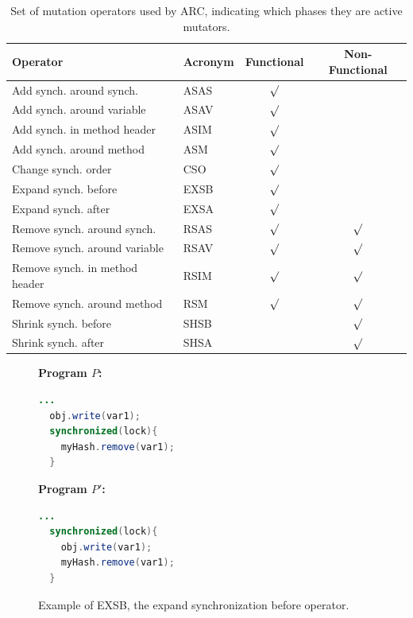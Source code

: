 \documentclass{llncs}
\begin{document}
\begin{table}
\caption{Set of mutation operators used by ARC, indicating which phases they
are active mutators.}
\begin{center}
\begin{tabular}{|l|l|c|c|}
\hline
\textbf{Operator} & \textbf{Acronym} & \textbf{Functional} & \textbf{Non-Functional}\\
\hline
Add synch. around synch. & ASAS & $\surd$ &\\
\hline
Add synch. around variable & ASAV & $\surd$ &\\
\hline
Add synch. in method header & ASIM & $\surd$ &\\
\hline
Add synch. around method & ASM & $\surd$ &\\
\hline
Change synch. order & CSO & $\surd$ &\\
\hline
Expand synch. before & EXSB & $\surd$ &\\
\hline
Expand synch. after & EXSA & $\surd$ &\\
\hline
Remove synch. around synch. & RSAS & $\surd$ & $\surd$\\
\hline
Remove synch. around variable & RSAV & $\surd$ & $\surd$\\
\hline
Remove synch. in method header & RSIM & $\surd$ & $\surd$\\
\hline
Remove synch. around method & RSM & $\surd$ & $\surd$\\
\hline
Shrink synch. before & SHSB & & $\surd$\\
\hline
Shrink synch. after & SHSA & & $\surd$\\
\hline
\end{tabular}
\label{tbl:operators}
\end{center}
\end{table}

\begin{figure}[h!]
\vspace{2mm}
\begin{minipage}{5cm}

\footnotesize{\textbf{ Program $P$:}}
\begin{lstlisting}[language=Java, morekeywords={synchronize}]
  ...
  obj.write(var1);
  synchronized(lock){
    myHash.remove(var1);
  }
\end{lstlisting}
\end{minipage}\hfill
\begin{minipage}{5cm}
\footnotesize{\textbf{ Program $P'$:}}
\begin{lstlisting}[language=Java, morekeywords={synchronize}]
  ...
  synchronized(lock){
    obj.write(var1);
    myHash.remove(var1);
  }
\end{lstlisting}
\end{minipage}

\caption{Example of EXSB, the expand synchronization before operator.}
\label{fig:EXSB_example}
\end{figure}
\end{document}
